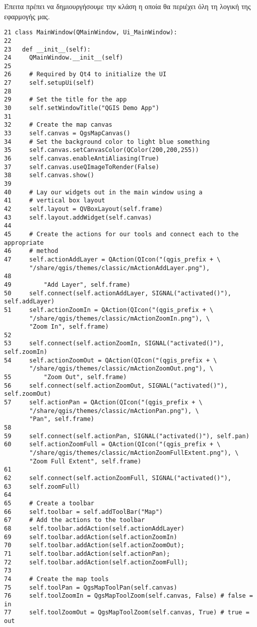 Έπειτα πρέπει να δημιουργήσουμε την κλάση  η οποία θα περιέχει όλη τη λογική της εφαρμογής μας. 
\begin{verbatim}
21 class MainWindow(QMainWindow, Ui_MainWindow):
22 
23   def __init__(self):
24     QMainWindow.__init__(self)
25 
26     # Required by Qt4 to initialize the UI
27     self.setupUi(self)
28 
29     # Set the title for the app
30     self.setWindowTitle("QGIS Demo App")
31 
32     # Create the map canvas
33     self.canvas = QgsMapCanvas()
34     # Set the background color to light blue something
35     self.canvas.setCanvasColor(QColor(200,200,255))
36     self.canvas.enableAntiAliasing(True)
37     self.canvas.useQImageToRender(False)
38     self.canvas.show()
39 
40     # Lay our widgets out in the main window using a 
41     # vertical box layout
42     self.layout = QVBoxLayout(self.frame)
43     self.layout.addWidget(self.canvas)
44 
45     # Create the actions for our tools and connect each to the appropriate
46     # method
47     self.actionAddLayer = QAction(QIcon("(qgis_prefix + \
       "/share/qgis/themes/classic/mActionAddLayer.png"),
48
49         "Add Layer", self.frame)
50     self.connect(self.actionAddLayer, SIGNAL("activated()"), self.addLayer)
51     self.actionZoomIn = QAction(QIcon("(qgis_prefix + \
       "/share/qgis/themes/classic/mActionZoomIn.png"), \
       "Zoom In", self.frame)
52     
53     self.connect(self.actionZoomIn, SIGNAL("activated()"), self.zoomIn)
54     self.actionZoomOut = QAction(QIcon("(qgis_prefix + \
       "/share/qgis/themes/classic/mActionZoomOut.png"), \
55         "Zoom Out", self.frame)
56     self.connect(self.actionZoomOut, SIGNAL("activated()"), self.zoomOut)
57     self.actionPan = QAction(QIcon("(qgis_prefix + \
       "/share/qgis/themes/classic/mActionPan.png"), \
       "Pan", self.frame)
58
59     self.connect(self.actionPan, SIGNAL("activated()"), self.pan)
60     self.actionZoomFull = QAction(QIcon("(qgis_prefix + \
       "/share/qgis/themes/classic/mActionZoomFullExtent.png"), \
       "Zoom Full Extent", self.frame)
61
62     self.connect(self.actionZoomFull, SIGNAL("activated()"),
63     self.zoomFull)
64 
65     # Create a toolbar
66     self.toolbar = self.addToolBar("Map")
67     # Add the actions to the toolbar
68     self.toolbar.addAction(self.actionAddLayer)
69     self.toolbar.addAction(self.actionZoomIn)
70     self.toolbar.addAction(self.actionZoomOut);
71     self.toolbar.addAction(self.actionPan);
72     self.toolbar.addAction(self.actionZoomFull);
73 
74     # Create the map tools
75     self.toolPan = QgsMapToolPan(self.canvas)
76     self.toolZoomIn = QgsMapToolZoom(self.canvas, False) # false = in
77     self.toolZoomOut = QgsMapToolZoom(self.canvas, True) # true = out
\end{verbatim}

